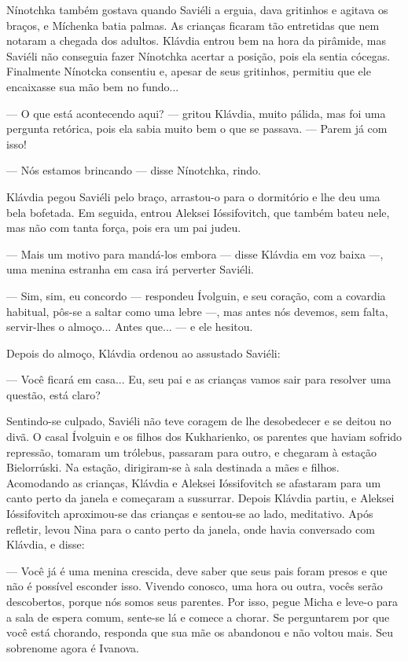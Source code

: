 Nínotchka também gostava quando Saviéli a erguia, dava gritinhos e
agitava os braços, e Míchenka batia palmas. As crianças ficaram tão
entretidas que nem notaram a chegada dos adultos. Klávdia entrou bem na
hora da pirâmide, mas Saviéli não conseguia fazer Nínotchka acertar a
posição, pois ela sentia cócegas. Finalmente Nínotcka consentiu e,
apesar de seus gritinhos, permitiu que ele encaixasse sua mão bem no
fundo...

--- O que está acontecendo aqui? --- gritou Klávdia, muito pálida, mas
foi uma pergunta retórica, pois ela sabia muito bem o que se passava.
--- Parem já com isso!

--- Nós estamos brincando --- disse Nínotchka, rindo.

Klávdia pegou Saviéli pelo braço, arrastou-o para o dormitório e lhe deu
uma bela bofetada. Em seguida, entrou Aleksei Ióssifovitch, que também
bateu nele, mas não com tanta força, pois era um pai judeu.

--- Mais um motivo para mandá-los embora --- disse Klávdia em voz baixa
---, uma menina estranha em casa irá perverter Saviéli.

--- Sim, sim, eu concordo --- respondeu Ívolguin, e seu coração, com a
covardia habitual, pôs-se a saltar como uma lebre ---, mas antes nós
devemos, sem falta, servir-lhes o almoço... Antes que... --- e ele
hesitou.

Depois do almoço, Klávdia ordenou ao assustado Saviéli:

--- Você ficará em casa... Eu, seu pai e as crianças vamos sair para
resolver uma questão, está claro?

Sentindo-se culpado, Saviéli não teve coragem de lhe desobedecer e se
deitou no divã. O casal Ívolguin e os filhos dos Kukharienko, os
parentes que haviam sofrido repressão, tomaram um trólebus, passaram
para outro, e chegaram à estação Bielorrúski. Na estação, dirigiram-se à
sala destinada a mães e filhos. Acomodando as crianças, Klávdia e
Aleksei Ióssifovitch se afastaram para um canto perto da janela e
começaram a sussurrar. Depois Klávdia partiu, e Aleksei Ióssifovitch
aproximou-se das crianças e sentou-se ao lado, meditativo. Após
refletir, levou Nina para o canto perto da janela, onde havia conversado
com Klávdia, e disse:

--- Você já é uma menina crescida, deve saber que seus pais foram presos
e que não é possível esconder isso. Vivendo conosco, uma hora ou outra,
vocês serão descobertos, porque nós somos seus parentes. Por isso, pegue
Micha e leve-o para a sala de espera comum, sente-se lá e comece a
chorar. Se perguntarem por que você está chorando, responda que sua mãe
os abandonou e não voltou mais. Seu sobrenome agora é Ivanova.

